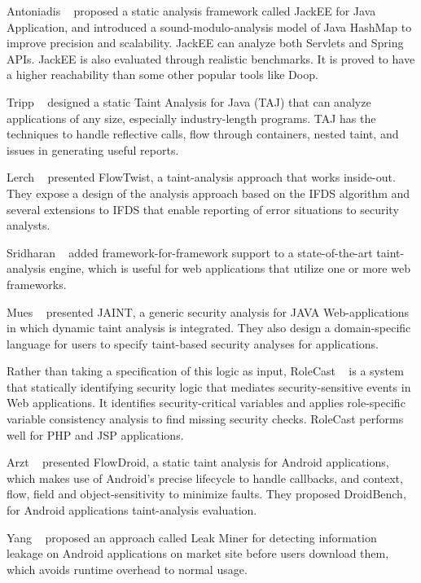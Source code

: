 Antoniadis \etal~\cite{Antoniadis+etal:2020:Java} proposed a static
analysis framework called JackEE for Java Application, and introduced a
sound-modulo-analysis model of Java HashMap to improve precision and
scalability. JackEE can analyze both Servlets and Spring APIs. JackEE is also
evaluated through realistic benchmarks. It is proved to have a higher
reachability than some other popular tools like Doop.

Tripp \etal~\cite{10.1145/1542476.1542486} designed a static Taint Analysis for
Java (TAJ) that can analyze applications of any size, especially industry-length
programs. TAJ has the techniques to handle reflective calls, flow through
containers, nested taint, and issues in generating useful reports.

Lerch \etal~\cite{10.1145/2635868.2635878} presented FlowTwist, a taint-analysis
approach that works inside-out. They expose a design of the analysis approach
based on the IFDS algorithm and several extensions to IFDS that enable reporting
of error situations to security analysts.

Sridharan \etal~\cite{10.1145/2076021.2048145} added framework-for-framework
support to a state-of-the-art taint-analysis engine, which is useful for web
applications that utilize one or more web frameworks.

Mues \etal~\cite{10.1007/978-3-030-63461-2_7} presented JAINT, a generic security
analysis for JAVA Web-applications in which dynamic taint analysis is
integrated. They also design a domain-specific language for users to specify
taint-based security analyses for applications.

Rather than taking a specification of this logic as input, RoleCast
\etal~\cite{10.1145/2048066.2048146} is a system that statically identifying
security logic that mediates security-sensitive events in Web applications. It
identifies security-critical variables and applies role-specific variable
consistency analysis to find missing security checks. RoleCast performs well for
PHP and JSP applications.

Arzt \etal~\cite{10.1145/2594291.2594299} presented FlowDroid, a static taint
analysis for Android applications, which makes use of Android's precise
lifecycle to handle callbacks, and context, flow, field and object-sensitivity
to minimize faults. They proposed DroidBench, for Android applications
taint-analysis evaluation.

Yang \etal~\cite{6394931} proposed an approach called
Leak Miner for detecting information leakage on Android applications on market
site before users download them, which avoids runtime overhead to normal usage.

